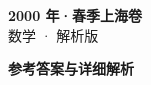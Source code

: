 \documentclass[zihao=-4, a4paper]{ctexart}
\begin{document}
\begin{center}
  {\Large\bfseries 2000 年·春季上海卷}\\[4pt]
  {\large 数学 · 解析版}
\end{center}
\medskip
{}

\clearpage
{}
\begin{center}{\Large\bfseries 参考答案与详细解析}\end{center}
\medskip

\end{document}
